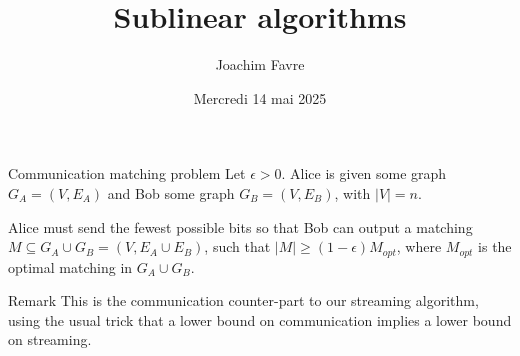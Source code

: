 \documentclass[a4paper]{article}
\title{Sublinear algorithms}
\author{Joachim Favre}
\date{Mercredi 14 mai 2025}
\begin{document}
\maketitle


\begin{parag}{Communication matching problem}
    Let $\epsilon > 0$. Alice is given some graph $G_A = \left(V, E_A\right)$ and Bob some graph $G_B = \left(V, E_B\right)$, with $\left|V\right| = n$. 

    Alice must send the fewest possible bits so that Bob can output a matching $M \subseteq G_A \cup G_B = \left(V, E_A \cup E_B\right)$, such that $\left|M\right| \geq \left(1 - \epsilon\right) M_{opt}$, where $M_{opt}$ is the optimal matching in $G_A \cup G_B$.
    
    \begin{subparag}{Remark}
        This is the communication counter-part to our streaming algorithm, using the usual trick that a lower bound on communication implies a lower bound on streaming.
    \end{subparag}
\end{parag}
\end{document}
